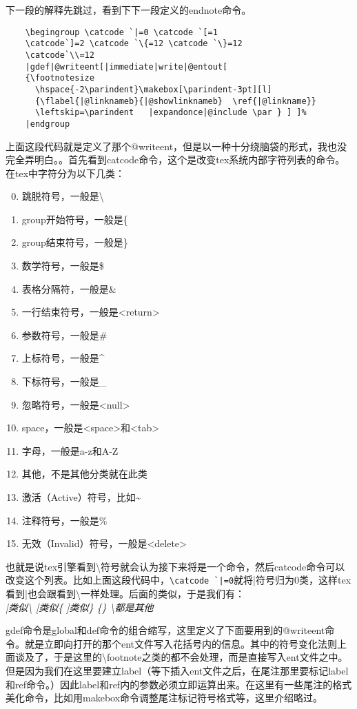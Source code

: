 \documentclass[11pt,oneside]{book}
\begin{document}
  下一段的解释先跳过，看到下下一段定义的endnote命令。
  \begin{Verbatim}
    \begingroup \catcode `|=0 \catcode `[=1
    \catcode`]=2 \catcode `\{=12 \catcode `\}=12
    \catcode`\\=12
    |gdef|@writeent[|immediate|write|@entout[
    {\footnotesize
      \hspace{-2\parindent}\makebox[\parindent-3pt][l]
      {\flabel{|@linknameb}{|@showlinknameb}  \ref{|@linkname}}
      \leftskip=\parindent   |expandonce|@include \par } ] ]%
    |endgroup
  \end{Verbatim}
  上面这段代码就是定义了那个@writeent，但是以一种十分绕脑袋的形式，我也没完全弄明白。。首先看到catcode命令，这个是改变tex系统内部字符列表的命令。在tex中字符分为以下几类：
  \begin{enumerate}
    \setcounter{enumi}{-1}
  \item 跳脱符号，一般是\textbackslash
  \item group开始符号，一般是\{
  \item group结束符号，一般是\}
  \item 数学符号，一般是\$
  \item 表格分隔符，一般是\&
  \item 一行结束符号，一般是<return>
  \item 参数符号，一般是\#
  \item 上标符号，一般是\^{}
  \item 下标符号，一般是\_
  \item 忽略符号，一般是<null>
  \item space，一般是<space>和<tab>
  \item 字母，一般是a-z和A-Z
  \item 其他，不是其他分类就在此类
  \item 激活（Active）符号，比如\~{}
  \item 注释符号，一般是\%
  \item 无效（Invalid）符号，一般是<delete>
  \end{enumerate}
  也就是说tex引擎看到\textbackslash 符号就会认为接下来将是一个命令，然后catcode命令可以改变这个列表。比如上面这段代码中，\verb+\catcode `|=0+就将|符号归为0类，这样tex看到|也会跟看到\textbackslash 一样处理。后面的类似，于是我们有：\\
  \emph{|类似\textbackslash{  }   [类似\{  ]类似\}  \{\} \textbackslash 都是其他 }

  gdef命令是global和def命令的组合缩写，这里定义了下面要用到的@writeent命令。就是立即向打开的那个ent文件写入花括号内的信息。其中的符号变化法则上面谈及了，于是这里的\textbackslash footnote之类的都不会处理，而是直接写入ent文件之中。但是因为我们在这里要建立label（等下插入ent文件之后，在尾注那里要标记label和ref命令。）因此label和ref内的参数必须立即运算出来。在这里有一些尾注的格式美化命令，比如用makebox命令调整尾注标记符号格式等，这里介绍略过。
\end{document}

